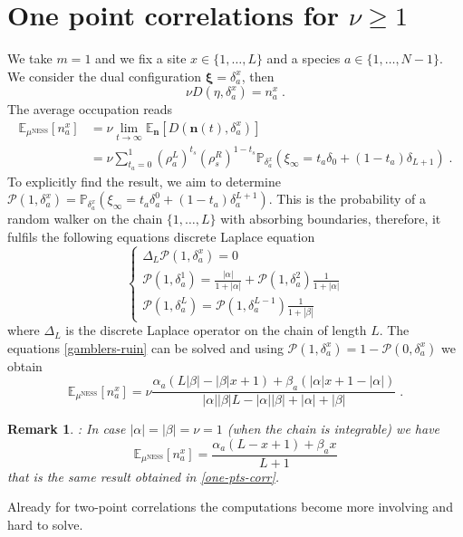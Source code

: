 \documentclass[10pt]{article}
\numberwithin{equation}{section}
\numberwithin{equation}{subsection}
\newtheorem{remark}{Remark}
\newcommand{\dt}{\;.}
\begin{document}
\section{One point correlations for $\nu\geq 1$}\label{appendix-1pts-general}
We take $m=1$ and we fix a site $x\in\{1,\ldots,L\}$ and a species $a\in \{1,\ldots,N-1\}$. We consider the dual configuration $\bm{\xi}=\delta_{a}^{x}$, then 
\begin{equation}
	\nu D(\eta,\delta_{a}^{x})=n_{a}^{x}\dt
\end{equation}
The average occupation reads
\begin{equation}\label{OnePtsCORR}
	\begin{split}
			\mathbb{E}_{\mu^{\text{NESS}}}\left[n_{a}^{x}\right]&=\nu\lim_{t\to\infty}\mathbb{E}_{\bm{n}}\left[D(\bm{n}(t),\delta_{a}^{x})\right]\\&=\nu\sum_{t_{a}=0}^{1}\left(\rho_{a}^{L}\right)^{t_{s}}\left(\rho_{s}^{R}\right)^{1-t_{s}}\mathbb{P}_{\delta_{a}^{x}}\left(\xi_{\infty}=t_{a}\delta_{0}+(1-t_{a})\delta_{L+1}\right)\dt
	\end{split}
\end{equation}
To explicitly find the result, we aim to determine $\mathcal{P}(1,\delta_{a}^{x})=\mathbb{P}_{\delta_{a}^{x}}\left(\xi_{\infty}=t_{a}\delta_{a}^{0}+(1-t_{a})\delta_{a}^{L+1}\right)$. This is the probability of a random walker on the chain $\{1,\ldots,L\}$ with absorbing boundaries, therefore, it fulfils the following equations discrete Laplace equation
\begin{equation}\label{gamblers-ruin}
	\begin{cases}
		\Delta_{L}\mathcal{P}(1,\delta_{a}^{x})=0\\
		\mathcal{P}(1,\delta_{a}^{1})=\frac{|\alpha|}{1+|\alpha|}+\mathcal{P}(1,\delta_{a}^{2})\frac{1}{1+|\alpha|}\\
		\mathcal{P}(1,\delta_{a}^{L})=\mathcal{P}(1,\delta_{a}^{L-1})\frac{1}{1+|\beta|}
	\end{cases}
\end{equation}
where $\Delta_{L}$ is the discrete Laplace operator on the chain of length $L$. The equations \eqref{gamblers-ruin} can be solved and using $\mathcal{P}(1,\delta_{a}^{x})=1-\mathcal{P}(0,\delta_{a}^{x})$ we obtain 
\begin{equation}
	\mathbb{E}_{\mu^{\text{NESS}}}\left[n_{a}^{x}\right]=\nu\frac{\alpha_{a}(L|\beta|-|\beta|x+1)+\beta_{a}(|\alpha|x+1-|\alpha|)}{|\alpha||\beta|L-|\alpha||\beta|+|\alpha|+|\beta|}\dt
\end{equation}
\begin{remark}: In case $|\alpha|=|\beta|=\nu=1$ (when the chain is integrable) we have 
\begin{equation}
		\mathbb{E}_{\mu^{\text{NESS}}}\left[n_{a}^{x}\right]=\frac{\alpha_{a}(L-x+1)+\beta_{a}x}{L+1}
\end{equation}
that is the same result obtained in \eqref{one-pts-corr}.  
\end{remark}
Already for two-point correlations the computations become more involving and hard to solve.
\end{document}
